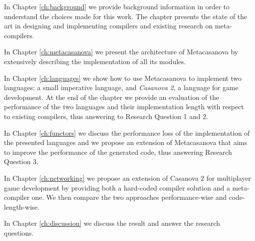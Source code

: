 In Chapter \ref{ch:background} we provide background information in order to understand the choices made for this work. The chapter presents the state of the art in designing and implementing compilers and existing research on meta-compilers.

In Chapter \ref{ch:metacasanova} we present the architecture of Metacasanova by extensively describing the implementation of all its modules.

In Chapter \ref{ch:languages} we show how to use Metacasanova to implement two languages: a small imperative language, and \textit{Casanova 2}, a language for game development. At the end of the chapter we provide an evaluation of the performance of the two languages and their implementation length with respect to existing compilers, thus answering to Research Question 1 and 2.

In Chapter \ref{ch:functors} we discuss the performance loss of the implementation of the presented languages and we propose an extension of Metacasanova that aims to improve the performance of the generated code, thus answering Research Question 3.

In Chapter \ref{ch:networking} we propose an extension of Casanova 2 for multiplayer game development by providing both a hard-coded compiler solution and a meta-compiler one. We then compare the two approaches performance-wise and code-length-wise.

In Chapter \ref{ch:discussion} we discuss the result and answer the research questions.